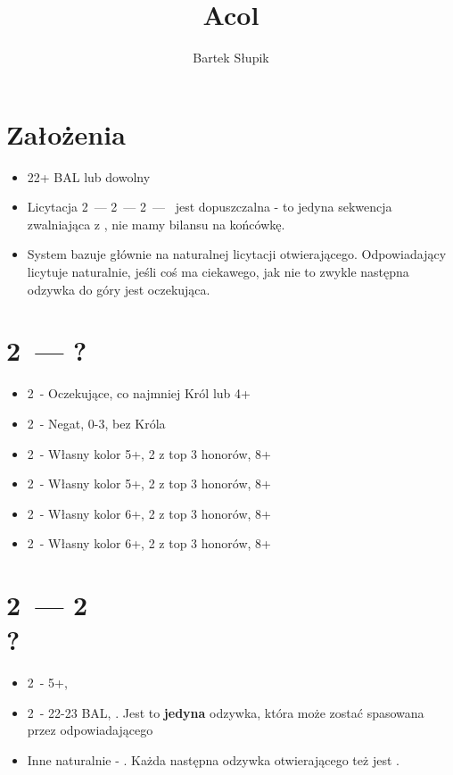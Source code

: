 \documentclass[12pt, a4paper]{article}
\title{Acol}
\author{Bartek Słupik}
\begin{document}
    \maketitle
    \section{Założenia}
    \begin{itemize}
        \item 22+ BAL lub dowolny \gf
        \item Licytacja 2\clubs\ --- 2\hearts\ --- 2\nt\ --- \pass\ jest dopuszczalna - to jedyna sekwencja zwalniająca
        z \gf, nie mamy bilansu na końcówkę.
        \item System bazuje głównie na naturalnej licytacji otwierającego. Odpowiadający licytuje 
        naturalnie, jeśli coś ma ciekawego, jak nie to zwykle następna odzywka do góry jest oczekująca.
    \end{itemize}

    \section{2\clubs\ --- ?}

    \begin{itemize}
        \item 2\diams\ - Oczekujące, co najmniej Król lub 4+\hcp
        \item 2\hearts\ - Negat, 0-3\hcp, bez Króla
        \item 2\spades\ - Własny kolor 5+\spades, 2 z top 3 honorów, 8+ \hcp
        \item 2\nt\ - Własny kolor 5+\hearts, 2 z top 3 honorów, 8+ \hcp
        \item 2\clubs\ - Własny kolor 6+\clubs, 2 z top 3 honorów, 8+ \hcp
        \item 2\diams\ - Własny kolor 6+\diams, 2 z top 3 honorów, 8+ \hcp
    \end{itemize}

    \section{2\clubs\ --- 2\hearts \\ ?}
    \begin{itemize}
        \item 2\spades\ - 5+\spades, \fonce
        \item 2\nt\ - 22-23 BAL, \nf. Jest to \textbf{jedyna} odzywka, która może zostać spasowana przez odpowiadającego
        \item Inne naturalnie - \fonce. Każda następna odzywka otwierającego też jest \fonce.
    \end{itemize}
\end{document}
